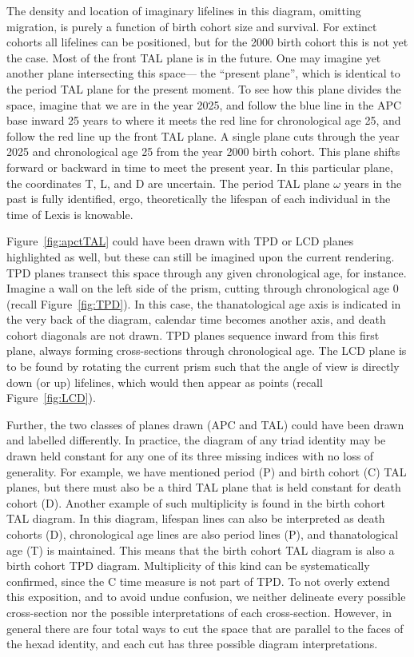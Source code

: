 \documentclass[12pt,oneside,a4paper]{article} %
\begin{document}
The density and location of imaginary lifelines in this diagram, omitting
migration, is purely a function of birth cohort size and survival. For extinct
cohorts all lifelines can be positioned, but for the 2000 birth cohort this is
not yet the case. Most of the front TAL plane is in the future. One may imagine
yet another plane intersecting this space--- the ``present plane'', which is
identical to the period TAL plane for the present moment. To see how this plane
divides the space, imagine that we are in the year 2025, and follow the blue
line in the APC base inward 25 years to where it meets the red line for chronological age 25, and follow the
red line up the front TAL plane. A single plane cuts through the year
2025 and chronological age 25 from the year 2000 birth cohort. This plane
shifts forward or backward in time to meet the present year. In this particular
plane, the coordinates T, L, and D are uncertain. The period TAL plane $\omega$
years in the past is fully identified, ergo, theoretically the lifespan of each
individual in the time of Lexis is knowable. 

Figure~\ref{fig:apctTAL} could have been drawn with TPD or LCD planes highlighted
as well, but these can still be imagined upon the current rendering. TPD planes
transect this space through any given chronological age, for instance. Imagine a
wall on the left side of the prism, cutting through chronological age 0 (recall
Figure~\ref{fig:TPD}).
In this case, the thanatological age axis is indicated in the very back of the diagram,
calendar time becomes another axis, and death cohort diagonals are not drawn.
TPD planes sequence inward from this first plane, always forming cross-sections
through chronological age. The LCD plane is to be found by rotating the current
prism such that the angle of view is directly down (or up) lifelines, which
would then appear as points (recall Figure~\ref{fig:LCD}).

Further, the two classes of planes drawn
(APC and TAL) could have been drawn and labelled differently.
In practice, the diagram of any triad identity may be drawn held constant for any one of its
three missing indices with no loss of generality. For example, we have
mentioned period (P) and birth cohort (C) TAL planes, but there must also be a
third TAL plane that is held constant for death cohort (D). Another example
of such multiplicity is found in the birth cohort TAL diagram. In this diagram,
lifespan lines can also be interpreted as death cohorts (D), chronological age
lines are also period lines (P), and thanatological age (T) is maintained. This
means that the birth cohort TAL diagram is also a birth cohort TPD diagram.
Multiplicity of this kind can be systematically confirmed, since the C time measure is not part of TPD. To not overly extend this exposition, and to avoid undue confusion, we neither delineate every possible cross-section nor the possible interpretations of each cross-section.
However, in general there are four total ways to cut the
space that are parallel to the faces of the hexad identity, and each cut
has three possible diagram interpretations.
\end{document}
